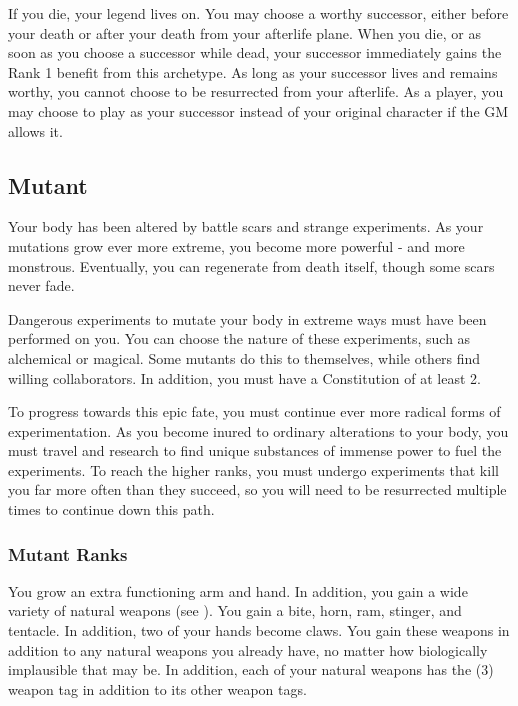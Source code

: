        If you die, your legend lives on.
      You may choose a worthy successor, either before your death or after your death from your afterlife plane.
      When you die, or as soon as you choose a successor while dead, your successor immediately gains the Rank 1 benefit from this archetype.
      As long as your successor lives and remains worthy, you cannot choose to be resurrected from your afterlife.
      As a player, you may choose to play as your successor instead of your original character if the GM allows it.

  \subsection{Mutant}
    Your body has been altered by battle scars and strange experiments.
    As your mutations grow ever more extreme, you become more powerful - and more monstrous.
    Eventually, you can regenerate from death itself, though some scars never fade.

     Dangerous experiments to mutate your body in extreme ways must have been performed on you.
    You can choose the nature of these experiments, such as alchemical or magical.
    Some mutants do this to themselves, while others find willing collaborators.
    In addition, you must have a Constitution of at least 2.

     To progress towards this epic fate, you must continue ever more radical forms of experimentation.
    As you become inured to ordinary alterations to your body, you must travel and research to find unique substances of immense power to fuel the experiments.
    To reach the higher ranks, you must undergo experiments that kill you far more often than they succeed, so you will need to be resurrected multiple times to continue down this path.

    \subsubsection{Mutant Ranks}
       You grow an extra functioning arm and hand.
      In addition, you gain a wide variety of natural weapons (see ).
      You gain a bite, horn, ram, stinger, and tentacle.
      In addition, two of your hands become claws.
      You gain these weapons in addition to any natural weapons you already have, no matter how biologically implausible that may be.
      In addition, each of your natural weapons has the  (3) weapon tag in addition to its other weapon tags.

